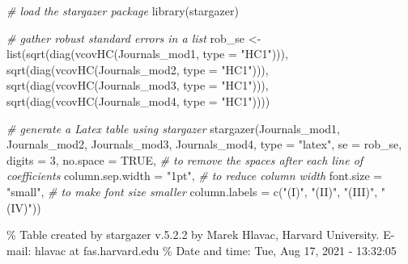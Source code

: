 \documentclass[
]{article}
\newenvironment{Shaded}{\begin{snugshade}}{\end{snugshade}}
\newcommand{\AttributeTok}[1]{\textcolor[rgb]{0.77,0.63,0.00}{#1}}
\newcommand{\CommentTok}[1]{\textcolor[rgb]{0.56,0.35,0.01}{\textit{#1}}}
\newcommand{\ConstantTok}[1]{\textcolor[rgb]{0.00,0.00,0.00}{#1}}
\newcommand{\DecValTok}[1]{\textcolor[rgb]{0.00,0.00,0.81}{#1}}
\newcommand{\FunctionTok}[1]{\textcolor[rgb]{0.00,0.00,0.00}{#1}}
\newcommand{\NormalTok}[1]{#1}
\newcommand{\OtherTok}[1]{\textcolor[rgb]{0.56,0.35,0.01}{#1}}
\newcommand{\StringTok}[1]{\textcolor[rgb]{0.31,0.60,0.02}{#1}}
\begin{document}
\begin{Shaded}
\begin{Highlighting}[]
\CommentTok{\# load the stargazer package}
\FunctionTok{library}\NormalTok{(stargazer)}

\CommentTok{\# gather robust standard errors in a list}
\NormalTok{rob\_se }\OtherTok{\textless{}{-}} \FunctionTok{list}\NormalTok{(}\FunctionTok{sqrt}\NormalTok{(}\FunctionTok{diag}\NormalTok{(}\FunctionTok{vcovHC}\NormalTok{(Journals\_mod1, }\AttributeTok{type =} \StringTok{"HC1"}\NormalTok{))),}
               \FunctionTok{sqrt}\NormalTok{(}\FunctionTok{diag}\NormalTok{(}\FunctionTok{vcovHC}\NormalTok{(Journals\_mod2, }\AttributeTok{type =} \StringTok{"HC1"}\NormalTok{))),}
               \FunctionTok{sqrt}\NormalTok{(}\FunctionTok{diag}\NormalTok{(}\FunctionTok{vcovHC}\NormalTok{(Journals\_mod3, }\AttributeTok{type =} \StringTok{"HC1"}\NormalTok{))),}
               \FunctionTok{sqrt}\NormalTok{(}\FunctionTok{diag}\NormalTok{(}\FunctionTok{vcovHC}\NormalTok{(Journals\_mod4, }\AttributeTok{type =} \StringTok{"HC1"}\NormalTok{))))}

\CommentTok{\# generate a Latex table using stargazer}
\FunctionTok{stargazer}\NormalTok{(Journals\_mod1, Journals\_mod2, Journals\_mod3, Journals\_mod4,}
          \AttributeTok{type =} \StringTok{"latex"}\NormalTok{,}
          \AttributeTok{se =}\NormalTok{ rob\_se,}
          \AttributeTok{digits =} \DecValTok{3}\NormalTok{,}
          \AttributeTok{no.space =} \ConstantTok{TRUE}\NormalTok{, }\CommentTok{\# to remove the spaces after each line of coefficients}
          \AttributeTok{column.sep.width =} \StringTok{"1pt"}\NormalTok{, }\CommentTok{\# to reduce column width}
          \AttributeTok{font.size =} \StringTok{"small"}\NormalTok{, }\CommentTok{\# to make font size smaller}
          \AttributeTok{column.labels =} \FunctionTok{c}\NormalTok{(}\StringTok{"(I)"}\NormalTok{, }\StringTok{"(II)"}\NormalTok{, }\StringTok{"(III)"}\NormalTok{, }\StringTok{"(IV)"}\NormalTok{))}
\end{Highlighting}
\end{Shaded}

\% Table created by stargazer v.5.2.2 by Marek Hlavac, Harvard
University. E-mail: hlavac at fas.harvard.edu \% Date and time: Tue, Aug
17, 2021 - 13:32:05
\end{document}
